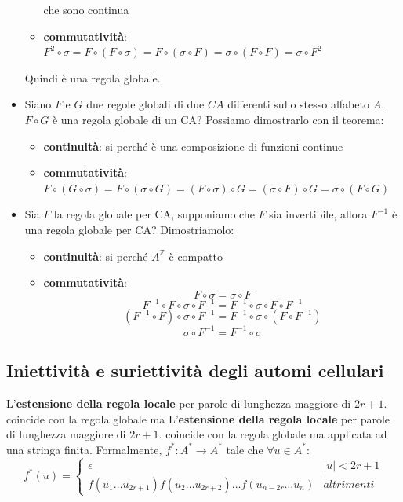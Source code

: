 \begin{itemize}
\begin{itemize}
              che sono continua
              \item \textbf{commutatività}: $F^2\circ \sigma = F\circ (F\circ \sigma ) = F\circ (\sigma\circ F  ) = \sigma\circ (F\circ F  )  = \sigma \circ F^2$
          \end{itemize}
          Quindi è una regola globale.
    \item Siano $F$ e $G$ due regole globali di due $CA$ differenti sullo stesso
          alfabeto $A$. $F\circ G$ è una regola globale di un CA? Possiamo dimostrarlo con
          il teorema:
          \begin{itemize}
              \item \textbf{continuità}: si perché è una composizione di funzioni continue
              \item \textbf{commutatività}: $F\circ (G\circ \sigma) = F\circ (\sigma\circ G) = (F\circ \sigma)\circ G =(\sigma\circ F)\circ G = \sigma\circ (F\circ G)$
          \end{itemize}
    \item Sia $F$ la regola globale per CA, supponiamo che $F$ sia invertibile,
          allora $F^{-1}$ è una regola globale per CA? Dimostriamolo:
          \begin{itemize}
              \item \textbf{continuità}: si perché $A^\mathbb{Z}$ è compatto
              \item \textbf{commutatività}: $$F\circ \sigma = \sigma \circ F $$
                    $$ F^{-1} \circ F\circ \sigma \circ F^{-1}= F^{-1}\circ \sigma \circ F \circ F^{-1}$$
                    $$ (F^{-1} \circ F)\circ \sigma \circ F^{-1}= F^{-1}\circ \sigma \circ (F \circ F^{-1})$$
                    $$ \sigma \circ F^{-1}= F^{-1}\circ \sigma$$
          \end{itemize}
\end{itemize}

\subsection{Iniettività e suriettività degli automi cellulari}

\begin{definizione} 
    L'\textbf{estensione della regola locale} per parole di lunghezza maggiore di
    $2r+1$. coincide con la regola globale ma
    L'\textbf{estensione della regola locale} per parole di lunghezza maggiore di
    $2r+1$. coincide con la regola globale ma
    applicata ad una stringa finita. Formalmente, $f^\ast: A^\ast\rightarrow A^\ast$
    tale che $\forall u\in A^\ast$:
    \begin{equation*}
        f^\ast(u) = \begin{cases}
            \epsilon                                                             & |u| < 2r+1 \\
            f(u_1\dots u_{2r+1})f(u_2\dots u_{2r+2})\dots f(u_{n-2r}\dots u_{n}) & altrimenti
        \end{cases}
    \end{equation*}
\end{definizione}

